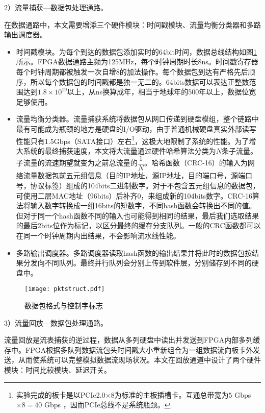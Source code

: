 2）流量捕获---数据包处理通路。

在数据通路中，本文需要增添三个硬件模块：时间戳模块、流量均衡分类器和多路输出调度器。

\begin{itemize}
	\item 时间戳模块。为每个到达的数据包添加实时的64bit时间，数据总线结构如图\ref{fig:pktstruct}所示。FPGA数据通路主频为125MHz，每个时钟周期时长8ns。时间戳寄存器每个时钟周期都被触发一次自增8的加法操作。每个数据包到达有严格先后顺序，所以每个数据包的时间戳都是独一无二的。64bits数据可以表达正整数范围达到$1.8\times10^{19}$以上，从ns换算成年，相当于地球年的500年以上，数据位宽足够使用。
	\item 流量均衡分类器。流量捕获系统将数据包从网口传递到硬盘模组，整个链路中最有可能成为瓶颈的地方是硬盘的I/O驱动，由于普通机械硬盘真实外部读写性能只有1.5Gbps（SATA接口）左右\footnote{实验完成的板卡是以PCIe2.0$ \times $8为标准的主板插槽卡。互通总带宽为$ 5$ Gbps $\times 8=40$  Gbps ，因而PCIe总线不是系统瓶颈。}，这极大地限制了系统的性能。为了增大系统的最终捕获速度，本文将大流量通过硬件哈希算法分类为$N$条子流量。子流量的流速期望就变为之前总流量的$\dfrac{1}{N}$。哈希函数（CRC-16）的输入为网络流量数据包前五元组信息（目的IP地址，源IP地址，目的端口号，源端口号，协议标签）组成的104bits二进制数字。对于不包含五元组信息的数据包，可使用二层MAC地址（96bits）后补齐0，来组成新的104bits数字。CRC-16算法将输入数字转换成一组16bits的短数字，不同hash函数会转换出不同的值。但对于同一个hash函数不同的输入也可能得到相同的结果，最后我们选取结果的最后2bits位作为标记，以区分最终的缓存分支队列。一般的CRC函数都可以在同一个时钟周期内出结果，不会影响流水线性能。
	\item 多路输出调度器。多路调度器读取hash函数的输出结果并将此时的数据包按结果分发向不同队列。最终并行队列会分别上传到软件层，分别储存到不同的硬盘中。

\end{itemize}

\begin{figure}[!ht]
	\centering 
	\vspace{-1.5mm}
	\texttt{[image: pktstruct.pdf]}
	\caption{数据包格式与控制字标志} \label{fig:pktstruct}
\end{figure}

3）流量回放---数据包处理通路。

流量回放是流表捕获的逆过程，数据从多列硬盘中读出并发送到FPGA内部多列缓存中。FPGA根据多队列数据流包头时间戳大小重新组合为一组数据流向板卡外发送，从而使系统可以完整模拟数据流现场状况。本文在回放通道中设计了两个硬件模块：时间比较模块、延迟开关。

